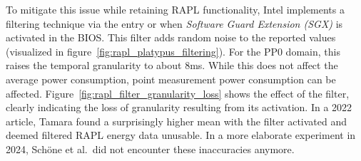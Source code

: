 \begin{itemize}
    To mitigate this issue while retaining RAPL functionality, Intel implements a filtering technique via the \parencite[Table 2-2]{intel2023} entry or when \textit{Software Guard Extension (SGX)} is activated in the BIOS. This filter adds random noise to the reported values (visualized in figure~\ref{fig:rapl_platypus_filtering}). For the PP0 domain, this raises the temporal granularity to about 8ms. While this does not affect the average power consumption, point measurement power consumption can be affected. Figure~\ref{fig:rapl_filter_granularity_loss} shows the effect of the filter, clearly indicating the loss of granularity resulting from its activation. In a 2022 article, Tamara\parencite{greencoding_rapl_sgx} found a surprisingly higher mean with the filter activated and deemed filtered RAPL energy data unusable. In a more elaborate experiment in 2024, Schöne et al.\ did not encounter these inaccuracies anymore.


\end{itemize}
